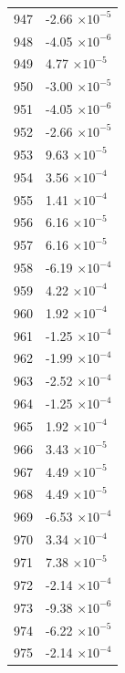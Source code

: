 \documentclass[a4paper,11pt]{article}
\begin{document}
\begin{center}
\begin{longtable}{|R{1.5cm}|R{2.5cm}|}
  947 &        -2.66 $\times 10^{          -5}$ \\
  948 &        -4.05 $\times 10^{          -6}$ \\
  949 &         4.77 $\times 10^{          -5}$ \\
  950 &        -3.00 $\times 10^{          -5}$ \\
  951 &        -4.05 $\times 10^{          -6}$ \\
  952 &        -2.66 $\times 10^{          -5}$ \\
  953 &         9.63 $\times 10^{          -5}$ \\
  954 &         3.56 $\times 10^{          -4}$ \\
  955 &         1.41 $\times 10^{          -4}$ \\
  956 &         6.16 $\times 10^{          -5}$ \\
  957 &         6.16 $\times 10^{          -5}$ \\
  958 &        -6.19 $\times 10^{          -4}$ \\
  959 &         4.22 $\times 10^{          -4}$ \\
  960 &         1.92 $\times 10^{          -4}$ \\
  961 &        -1.25 $\times 10^{          -4}$ \\
  962 &        -1.99 $\times 10^{          -4}$ \\
  963 &        -2.52 $\times 10^{          -4}$ \\
  964 &        -1.25 $\times 10^{          -4}$ \\
  965 &         1.92 $\times 10^{          -4}$ \\
  966 &         3.43 $\times 10^{          -5}$ \\
  967 &         4.49 $\times 10^{          -5}$ \\
  968 &         4.49 $\times 10^{          -5}$ \\
  969 &        -6.53 $\times 10^{          -4}$ \\
  970 &         3.34 $\times 10^{          -4}$ \\
  971 &         7.38 $\times 10^{          -5}$ \\
  972 &        -2.14 $\times 10^{          -4}$ \\
  973 &        -9.38 $\times 10^{          -6}$ \\
  974 &        -6.22 $\times 10^{          -5}$ \\
  975 &        -2.14 $\times 10^{          -4}$ \\

\end{longtable}
\end{center}
\end{document}
